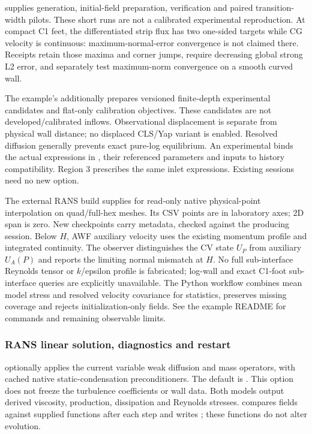  supplies generation,
initial-field preparation, verification and paired transition-width pilots.
These short runs are not a calibrated experimental reproduction. At compact
C1 feet, the differentiated strip flux has two one-sided targets while CG
velocity is continuous: maximum-normal-error convergence is not claimed there.
Receipts retain those maxima and corner jumps, require decreasing global strong
L2 error, and separately test maximum-norm convergence on a smooth curved wall.

The example's  additionally prepares versioned finite-depth
experimental candidates and flat-only calibration objectives. These candidates
are not developed/calibrated inflows. Observational displacement is separate
from physical wall distance; no displaced CLS/Yap variant is enabled. Resolved
 diffusion generally prevents exact pure-log equilibrium.
An experimental  binds the actual expressions
in , their referenced parameters and
 inputs to history compatibility. Region 3 prescribes
the same inlet expressions. Existing sessions need no new option.

The external RANS build supplies  for read-only
native physical-point interpolation on quad/full-hex meshes. Its CSV points
are  in laboratory axes; 2D span is zero. New checkpoints
carry  metadata, checked against the
producing session. Below $H$, AWF auxiliary velocity uses the existing momentum
profile and integrated continuity. The observer distinguishes the CV state
$U_P$ from auxiliary $U_A(P)$ and reports the limiting normal mismatch at $H$.
No full sub-interface Reynolds tensor or $k$/epsilon profile is fabricated;
log-wall and exact C1-foot sub-interface queries are explicitly unavailable.
The Python workflow combines mean model stress and resolved velocity covariance
for statistics, preserves missing coverage and rejects initialization-only
fields. See the example README for commands and remaining observable limits.

\subsubsection{RANS linear solution, diagnostics and restart}
 optionally applies the current variable
weak diffusion and mass operators, with cached native static-condensation
preconditioners. The default is . This option does not freeze the
turbulence coefficients or wall data. Both models output derived viscosity,
production, dissipation and Reynolds stresses. 
compares fields against supplied  functions after each
step and writes ; these functions do not alter evolution.

